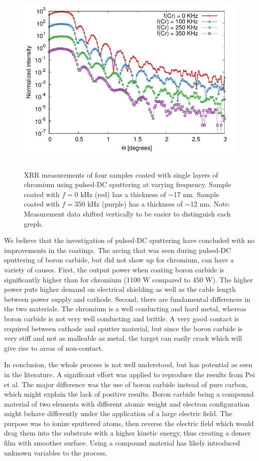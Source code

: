 \begin{figure}[!h]
	\center
	\includegraphics[height=9.5cm]{figures/athena/coatings/cr_pulsed_2.pdf}
\caption{\footnotesize XRR measurements of four samples coated with single layers of chromium using pulsed-DC sputtering at varying frequency. Sample coated with $f=0$ kHz (red) has a thickness of $\sim$17 nm. Sample coated with $f=350$ kHz (purple) has a thickness of $\sim$12 nm. Note: Measurement data shifted vertically to be easier to distinguish each greph.}\label{fig:cr-pulsed}
\end{figure}

We believe that the investigation of pulsed-DC sputtering have concluded with no improvements in the coatings. The arcing that was seen during pulsed-DC sputtering of boron carbide, but did not show up for chromium, can have a variety of causes. First, the output power when coating boron carbide is significantly higher than for chromium (1100 W compared to 450 W). The higher power puts higher demand on electrical shielding as well as the cable length between power supply and cathode. Second, there are fundamental differences in the two materials. The chromium is a well conducting and hard metal, whereas boron carbide is not very well conducting and brittle. A very good contact is required between cathode and sputter material, but since the boron carbide is very stiff and not as malleable as metal, the target can easily crack which will give rise to areas of non-contact.

In conclusion, the whole process is not well understood, but has potential as seen in the literature. A significant effort was applied to reproduce the results from Pei et al\cite{Pei:2009gn}. The major difference was the use of boron carbide instead of pure carbon, which might explain the lack of positive results. Boron carbide being a compound material of two elements with different atomic weight and electron configuration might behave differently under the application of a large electric field. The purpose was to ionize sputtered atoms, then reverse the electric field which would drag them into the substrate with a higher kinetic energy, thus creating a denser film with smoother surface. Using a compound material has likely introduced unknown variables to the process.

